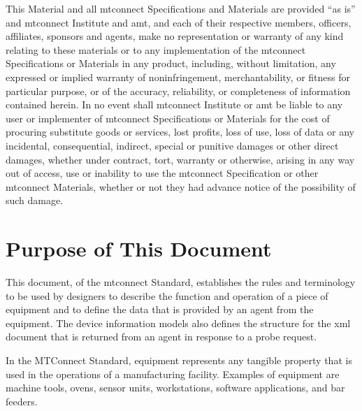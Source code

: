 \documentclass{mtconnect}	%
\begin{document}
\begin{nolinenumbers}
This Material and all \gls{mtconnect} Specifications and Materials are provided ``as is'' and \gls{mtconnect} Institute and \gls{amt}, and each of their respective members, officers, affiliates, sponsors and agents, make no representation or warranty of any kind relating to these materials or to any implementation of the \gls{mtconnect} Specifications or Materials in any product, including, without limitation, any expressed or implied warranty of noninfringement, merchantability, or fitness for particular purpose, or of the accuracy, reliability, or completeness of information contained herein. In no event shall \gls{mtconnect} Institute or \gls{amt} be liable to any user or implementer of \gls{mtconnect} Specifications or Materials for the cost of procuring substitute goods or services, lost profits, loss of use, loss of data or any incidental, consequential, indirect, special or punitive damages or other direct damages, whether under contract, tort, warranty or otherwise, arising in any way out of access, use or inability to use the \gls{mtconnect} Specification or other \gls{mtconnect} Materials, whether or not they had advance notice of the possibility of such damage.


\clearpage
\tableofcontents
\thispagestyle{fancy}
\clearpage
\listoffigures
\thispagestyle{fancy}
\clearpage
\listoftables
\end{nolinenumbers}



\section{Purpose of This Document}

This document,  of the \gls{mtconnect}  Standard, establishes the rules and terminology to be used by designers to describe the function and operation of a piece of equipment and to define the data that is provided by an \gls{agent} from the equipment.  The \glspl{device information model}  also defines the structure for the \gls{xml} document that is returned from an \gls{agent} in response to a \gls{probe request}. 

In the MTConnect Standard, equipment represents any tangible property that is used in the operations of a manufacturing facility.  Examples of equipment are machine tools, ovens, sensor units, workstations, software applications, and bar feeders. 
\end{document}
